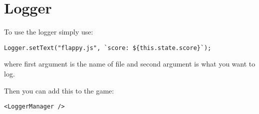 \section{Logger}
To use the logger simply use:

\begin{lstlisting}
Logger.setText("flappy.js", `score: ${this.state.score}`);
\end{lstlisting}

where first argument is the name of file and second argument is what you want to log.

Then you can add this to the game:
\begin{lstlisting}
<LoggerManager /> 
\end{lstlisting}

  